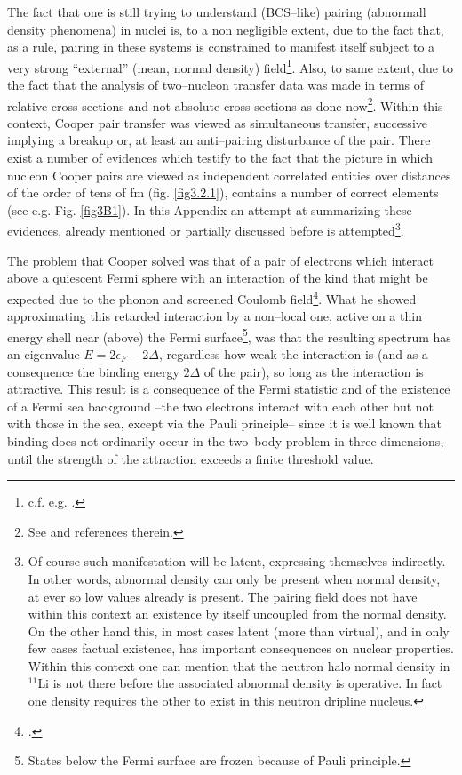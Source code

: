 \begin{subappendices}
The fact that one is still trying to understand (BCS--like) pairing (abnormall density phenomena) in nuclei is, to a non negligible extent, due to the fact that, as a rule, pairing in these systems is constrained to manifest itself subject to a very strong ``external'' (mean, normal density) field\footnote{c.f. e.g. \cite{Matsuo:13}.}. Also, to same extent, due to the fact that the analysis of two--nucleon transfer data was made in terms of relative cross sections and not absolute cross sections as done now\footnote{See \cite{Potel:13} and references therein.}. Within this context, Cooper pair transfer was viewed as simultaneous transfer, successive implying a breakup or, at least an anti--pairing disturbance of the pair. There exist a number of evidences which testify to the fact that the picture in which nucleon Cooper pairs are viewed as independent correlated entities over distances of the order of tens of fm (fig. \ref{fig3.2.1}), contains a number of correct elements (see e.g. Fig. \ref{fig3B1}). In this Appendix an attempt at summarizing these evidences, already mentioned or partially discussed before is attempted\footnote{Of course such manifestation will be latent, expressing themselves indirectly. In other words, abnormal density can only be present when normal density, at ever so low values already is present. The pairing field does not have within this context an existence by itself uncoupled from the normal density. On the other hand this, in most cases latent (more than virtual), and in only few cases factual existence, has important consequences on nuclear properties. Within this context one can mention that the neutron halo normal density in $^{11}$Li is not there before the associated abnormal density is operative. In fact one density requires the other to exist in this neutron dripline nucleus.}.


 The problem that Cooper solved was that of a pair of electrons which interact above a quiescent Fermi sphere with  an interaction of the kind that might be expected due to the phonon and screened Coulomb field\footnote{\cite{Cooper:56}.}. What he showed approximating this retarded interaction by a non--local one, active on a thin energy shell near (above) the Fermi surface\footnote{States below the Fermi surface are frozen because of Pauli principle.}, was that the resulting spectrum has an eigenvalue $E=2\epsilon_F-2\Delta$, regardless how weak the interaction is (and as a consequence the binding energy $2\Delta$ of the pair), so long as the interaction is attractive. This result is a consequence of the Fermi statistic and of the existence of a Fermi sea background --the two electrons interact with each other but not with those in the sea, except via the Pauli principle-- since it is well known that binding does not ordinarily occur in the two--body problem in three dimensions, until the strength of the attraction exceeds a finite threshold value.


\end{subappendices}

